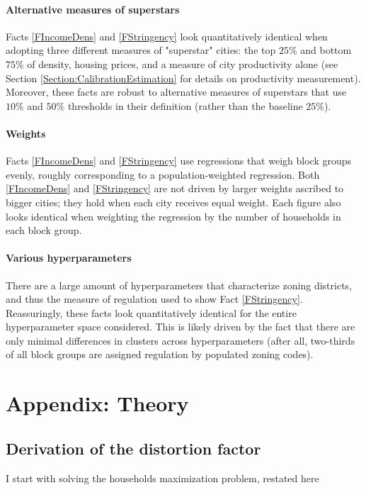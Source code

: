 \documentclass[12pt]{article}
\begin{document}
	\paragraph*{Alternative measures of superstars} Facts \ref{FIncomeDens} and \ref{FStringency} look quantitatively identical when adopting three different measures of "superstar" cities: the top $25\%$  and bottom  $75\%$ of density, housing prices, and a measure of city productivity alone (see Section \ref{Section:CalibrationEstimation} for details on productivity measurement). Moreover, these facts are robust to alternative measures of superstars that use $10 \%$ and $50 \%$ thresholds in their definition (rather than the baseline $25\%$).  
	
	\paragraph*{Weights} Facts \ref{FIncomeDens} and \ref{FStringency} use regressions that weigh block groups evenly, roughly corresponding to a population-weighted regression. Both \ref{FIncomeDens} and \ref{FStringency} are not driven by larger weights ascribed to bigger cities; they hold when each city receives equal weight. Each figure also looks identical when weighting the regression by the number of households in each block group.
	
	\paragraph*{Various hyperparameters} There are a large amount of hyperparameters that characterize zoning districts, and thus the measure of regulation used to show Fact \ref{FStringency}. Reassuringly, these facts look quantitatively identical for the entire hyperparameter space considered. This is likely driven by the fact that there are only minimal differences in clusters across hyperparameters (after all, two-thirds of all block groups are assigned regulation by populated zoning codes). 
	
	
	
	\clearpage 
	\section{Appendix: Theory}\label{TheoryAppendix}
	
	\subsection{Derivation of the distortion factor}\label{derive_distortion}
	I start with solving the households maximization problem, restated here 
	
\end{document}
